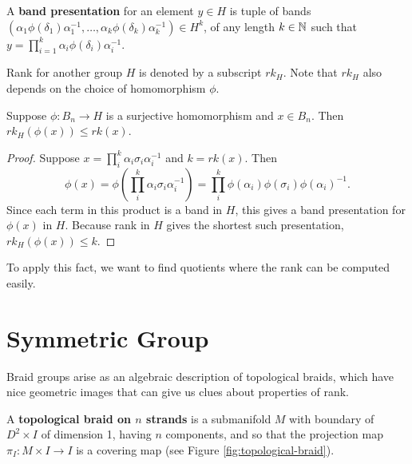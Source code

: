 \documentclass[12pt]{thesis}
\begin{document}
\begin{definition}
    \label{def:quotient-band-presentation}
    \begin{sloppypar}
    A \textbf{band presentation} for an element $y \in H$
    is tuple of bands $(\alpha_{1} \phi(\delta_{1}) \alpha_{1}^{-1}, \ldots,
        \alpha_{k} \phi(\delta_{k}) \alpha_{k}^{-1}) \in H^{k}$,
    of any length $k \in \mathbb{N}$
        such that $y = \prod_{i=1}^{k} \alpha_{i} \phi(\delta_{i}) \alpha_{i}^{-1}$.
    \end{sloppypar}
\end{definition}
Rank for another group $H$ is denoted by a subscript $rk_{H}$.
Note that $rk_{H}$ also depends on the choice of homomorphism $\phi$.

\begin{proposition}
    \label{prop:lower-bounds-from-quotient}
Suppose $\phi \colon B_{n} \rightarrow H$ is a surjective homomorphism and $x \in B_{n}$. Then $rk_{H}(\phi(x)) \leq rk(x)$.
\end{proposition}

\begin{proof}
Suppose $x = \prod_{i}^{k} \alpha_{i}\sigma_{i}\alpha_{i}^{-1}$
and $k = rk(x)$.
Then 
\[
    \phi(x)
    = \phi(\prod_{i}^{k} \alpha_{i}\sigma_{i}\alpha_{i}^{-1})
    = \prod_{i}^{k} \phi(\alpha_{i})\phi(\sigma_{i})\phi(\alpha_{i})^{-1}.
\]
Since each term in this product is a band in $H$, this gives a
band presentation for $\phi(x)$ in $H$.
Because rank in $H$ gives the shortest such presentation, $rk_{H}(\phi(x)) \leq k$.
\end{proof}

To apply this fact, we want to find quotients
where the rank can be computed easily.

\section{Symmetric Group}

\label{chap:symmetric-group}

Braid groups arise as an algebraic description of topological braids,
which have nice geometric images that can give us clues about properties of rank.
\begin{definition}
    A \textbf{topological braid on $n$ strands} is a submanifold $M$ with boundary of $D^{2} \times I$ of dimension 1, having $n$ components,
    and so that the projection map $\pi_{I} \colon M \times I \rightarrow I$
    is a covering map
    (see Figure \ref{fig:topological-braid}).
\end{definition}
\end{document}
